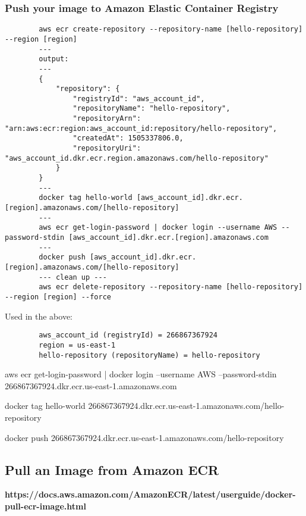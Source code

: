 \documentclass[11pt]{article}
\begin{document}
    \subsubsection*{Push your image to Amazon Elastic Container Registry}
    \begin{lstlisting}
        aws ecr create-repository --repository-name [hello-repository] --region [region]
        ---
        output:
        ---
        {
            "repository": {
                "registryId": "aws_account_id",
                "repositoryName": "hello-repository",
                "repositoryArn": "arn:aws:ecr:region:aws_account_id:repository/hello-repository",
                "createdAt": 1505337806.0,
                "repositoryUri": "aws_account_id.dkr.ecr.region.amazonaws.com/hello-repository"
            }
        }
        ---
        docker tag hello-world [aws_account_id].dkr.ecr.[region].amazonaws.com/[hello-repository]
        ---
        aws ecr get-login-password | docker login --username AWS --password-stdin [aws_account_id].dkr.ecr.[region].amazonaws.com
        ---
        docker push [aws_account_id].dkr.ecr.[region].amazonaws.com/[hello-repository]
        --- clean up ---
        aws ecr delete-repository --repository-name [hello-repository] --region [region] --force
    \end{lstlisting}
    Used in the above:
    \begin{lstlisting}
        aws_account_id (registryId) = 266867367924
        region = us-east-1
        hello-repository (repositoryName) = hello-repository
    \end{lstlisting}

    aws ecr get-login-password | docker login --username AWS --password-stdin 266867367924.dkr.ecr.us-east-1.amazonaws.com

    docker tag hello-world 266867367924.dkr.ecr.us-east-1.amazonaws.com/hello-repository

    docker push 266867367924.dkr.ecr.us-east-1.amazonaws.com/hello-repository

    \subsection{Pull an Image from Amazon ECR}
    \textbf{https://docs.aws.amazon.com/AmazonECR/latest/userguide/docker-pull-ecr-image.html}
\end{document}
